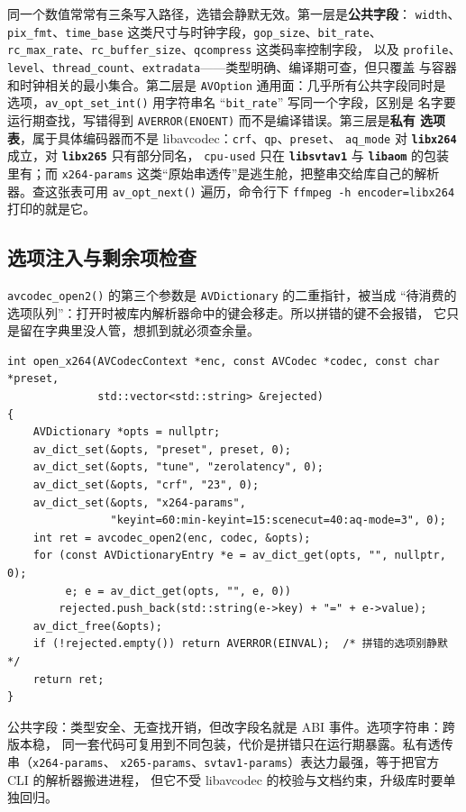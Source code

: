 \documentclass[12pt,a4paper,fontset=fandol]{ctexbook}
\newcommand{\Fn}[1]{\texttt{#1()}}
\newcommand{\Tp}[1]{\texttt{#1}}
\newcommand{\Bk}{\discretionary{}{}{}}
\newcommand{\Lib}[1]{\textbf{\texttt{#1}}}
\begin{document}
同一个数值常常有三条写入路径，选错会静默无效。第一层是\textbf{公共字段}：
\Tp{width}、\Tp{pix\_fmt}、\Tp{time\_base} 这类尺寸与时钟字段，\Tp{gop\_size}、\Tp{bit\_rate}、
\Tp{rc\_{\Bk}max\_{\Bk}rate}、\Tp{rc\_{\Bk}buffer\_{\Bk}size}、\Tp{qcompress} 这类码率控制字段，
以及 \Tp{profile}、\Tp{level}、\Tp{thread\_{\Bk}count}、\Tp{extradata}——类型明确、编译期可查，但只覆盖
与容器和时钟相关的最小集合。第二层是 \Tp{AVOption} 通用面：几乎所有公共字段同时是
选项，\Fn{av\_{\Bk}opt\_{\Bk}set\_{\Bk}int} 用字符串名 ``\Tp{bit\_rate}'' 写同一个字段，区别是
名字要运行期查找，写错得到 \Tp{AVERROR(ENOENT)} 而不是编译错误。第三层是\textbf{私有
选项表}，属于具体编码器而不是 libavcodec：\Tp{crf}、\Tp{qp}、\Tp{preset}、
\Tp{aq\_mode} 对 \Lib{libx264} 成立，对 \Lib{libx265} 只有部分同名，
\Tp{cpu-used} 只在 \Lib{libsvtav1} 与 \Lib{libaom} 的包装里有；而
\Tp{x264-params} 这类``原始串透传''是逃生舱，把整串交给库自己的解析器。查这张表可用
\Fn{av\_{\Bk}opt\_{\Bk}next} 遍历，命令行下 \texttt{ffmpeg -h encoder=libx264} 打印的就是它。

\subsection{选项注入与剩余项检查}

\Fn{avcodec\_open2} 的第三个参数是 \Tp{AVDictionary} 的二重指针，被当成
``待消费的选项队列''：打开时被库内解析器命中的键会移走。所以拼错的键不会报错，
它只是留在字典里没人管，想抓到就必须查余量。

\begin{lstlisting}[style=cppstyle,caption={用 AVDictionary 注入选项，并把未消费的键视为配置错误},label={lst:ch06-dict}]
int open_x264(AVCodecContext *enc, const AVCodec *codec, const char *preset,
              std::vector<std::string> &rejected)
{
    AVDictionary *opts = nullptr;
    av_dict_set(&opts, "preset", preset, 0);
    av_dict_set(&opts, "tune", "zerolatency", 0);
    av_dict_set(&opts, "crf", "23", 0);
    av_dict_set(&opts, "x264-params",
                "keyint=60:min-keyint=15:scenecut=40:aq-mode=3", 0);
    int ret = avcodec_open2(enc, codec, &opts);
    for (const AVDictionaryEntry *e = av_dict_get(opts, "", nullptr, 0);
         e; e = av_dict_get(opts, "", e, 0))
        rejected.push_back(std::string(e->key) + "=" + e->value);
    av_dict_free(&opts);
    if (!rejected.empty()) return AVERROR(EINVAL);  /* 拼错的选项别静默 */
    return ret;
}
\end{lstlisting}

\begin{compare}[title={三条写入路径的取舍}]
公共字段：类型安全、无查找开销，但改字段名就是 ABI 事件。选项字符串：跨版本稳，
同一套代码可复用到不同包装，代价是拼错只在运行期暴露。私有透传串（\Tp{x264-params}、
\Tp{x265-params}、\Tp{svtav1-params}）表达力最强，等于把官方 CLI 的解析器搬进进程，
但它不受 libavcodec 的校验与文档约束，升级库时要单独回归。
\end{compare}
\end{document}
